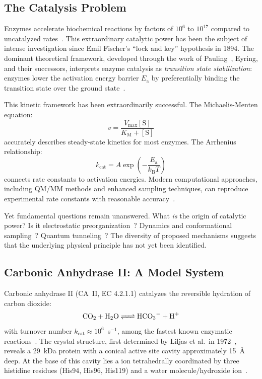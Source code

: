 \documentclass[twocolumn,amsmath,amssymb,aps,prb,superscriptaddress,longbibliography]{revtex4-2}
\newcommand{\kcat}{k_{\mathrm{cat}}}
\newcommand{\kB}{k_{\mathrm{B}}}
\newcommand{\Km}{K_{\mathrm{M}}}
\newcommand{\Vmax}{V_{\mathrm{max}}}
\newcommand{\Ea}{E_{\mathrm{a}}}
\begin{document}
\subsection{The Catalysis Problem}

Enzymes accelerate biochemical reactions by factors of $10^{6}$ to $10^{17}$ compared to uncatalyzed rates~\cite{Wolfenden1999}. This extraordinary catalytic power has been the subject of intense investigation since Emil Fischer's ``lock and key'' hypothesis in 1894. The dominant theoretical framework, developed through the work of Pauling~\cite{Pauling1946}, Eyring, and their successors, interprets enzyme catalysis as \emph{transition state stabilization}: enzymes lower the activation energy barrier $\Ea$ by preferentially binding the transition state over the ground state~\cite{Fersht1999}.

This kinetic framework has been extraordinarily successful. The Michaelis-Menten equation:
\begin{equation}
v = \frac{\Vmax [\text{S}]}{\Km + [\text{S}]}
\label{eq:michaelis-menten}
\end{equation}
accurately describes steady-state kinetics for most enzymes. The Arrhenius relationship:
\begin{equation}
\kcat = A \exp\left(-\frac{\Ea}{\kB T}\right)
\label{eq:arrhenius}
\end{equation}
connects rate constants to activation energies. Modern computational approaches, including QM/MM methods and enhanced sampling techniques, can reproduce experimental rate constants with reasonable accuracy~\cite{Warshel1998, Garcia-Viloca2004, Kamerlin2010}.

Yet fundamental questions remain unanswered. What \emph{is} the origin of catalytic power? Is it electrostatic preorganization~\cite{Warshel1998}? Dynamics and conformational sampling~\cite{Kamerlin2010, Kohen2015}? Quantum tunneling~\cite{Nagel2006}? The diversity of proposed mechanisms suggests that the underlying physical principle has not yet been identified.

\subsection{Carbonic Anhydrase II: A Model System}

Carbonic anhydrase II (CA~II, EC 4.2.1.1) catalyzes the reversible hydration of carbon dioxide:
\begin{equation}
\ce{CO2 + H2O <=> HCO3- + H+}
\label{eq:caii-reaction}
\end{equation}
with turnover number $\kcat \approx 10^6$~s$^{-1}$, among the fastest known enzymatic reactions~\cite{Lindskog1997, Krishnamurthy2008}. The crystal structure, first determined by Liljas et al.\ in 1972~\cite{Liljas1972}, reveals a 29~kDa protein with a conical active site cavity approximately 15~\AA{} deep. At the base of this cavity lies a  ion tetrahedrally coordinated by three histidine residues (His94, His96, His119) and a water molecule/hydroxide ion~\cite{Hakansson1992}.
\end{document}
